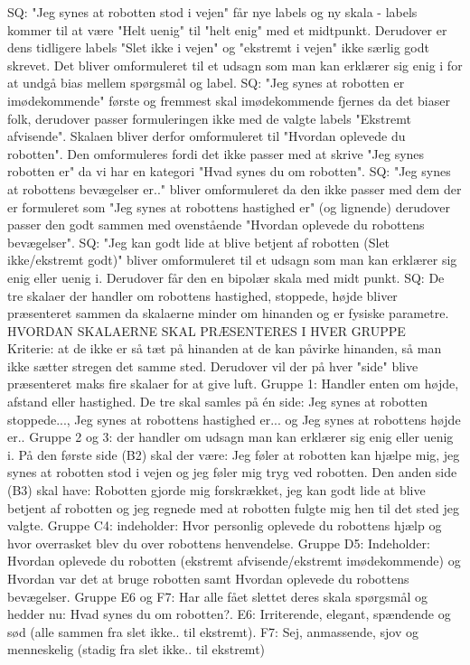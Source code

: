 %
SQ: "Jeg synes at robotten stod i vejen" får nye labels og ny skala - labels kommer til at være "Helt uenig" til "helt enig" med et midtpunkt. Derudover er dens tidligere labels "Slet ikke i vejen" og "ekstremt i vejen" ikke særlig godt skrevet. Det bliver omformuleret til et udsagn som man kan erklærer sig enig i for at undgå bias mellem spørgsmål og label.\blankline
%
SQ: "Jeg synes at robotten er imødekommende" første og fremmest skal imødekommende fjernes da det biaser folk, derudover passer formuleringen ikke med de valgte labels "Ekstremt afvisende". Skalaen bliver derfor omformuleret til "Hvordan oplevede du robotten". Den omformuleres fordi det ikke passer med at skrive "Jeg synes robotten er" da vi har en kategori "Hvad synes du om robotten". \blankline
%
SQ: "Jeg synes at robottens bevægelser er.." bliver omformuleret da den ikke passer med dem der er formuleret som "Jeg synes at robottens hastighed er" (og lignende) derudover passer den godt sammen med ovenstående "Hvordan oplevede du robottens bevægelser".\blankline
%
SQ: "Jeg kan godt lide at blive betjent af robotten (Slet ikke/ekstremt godt)" bliver omformuleret til et udsagn som man kan erklærer sig enig eller uenig i. Derudover får den en bipolær skala med midt punkt. \blankline
%
SQ: De tre skalaer der handler om robottens hastighed, stoppede, højde bliver præsenteret sammen da skalaerne minder om hinanden og er fysiske parametre. \blankline
%
HVORDAN SKALAERNE SKAL PRÆSENTERES I HVER GRUPPE\\
Kriterie: at de ikke er så tæt på hinanden at de kan påvirke hinanden, så man ikke sætter stregen det samme sted. Derudover vil der på hver "side" blive præsenteret maks fire skalaer for at give luft.\blankline 
%
Gruppe 1: Handler enten om højde, afstand eller hastighed. De tre skal samles på én side: Jeg synes at robotten stoppede..., Jeg synes at robottens hastighed er... og Jeg synes at robottens højde er..\blankline
%
Gruppe 2 og 3: der handler om udsagn man kan erklærer sig enig eller uenig i. På den første side (B2) skal der være: Jeg føler at robotten kan hjælpe mig, jeg synes at robotten stod i vejen og jeg føler mig tryg ved robotten. Den anden side (B3) skal have: Robotten gjorde mig forskrækket, jeg kan godt lide at blive betjent af robotten og jeg regnede med at robotten fulgte mig hen til det sted jeg valgte. \blankline
%
Gruppe C4: indeholder: Hvor personlig oplevede du robottens hjælp og hvor overrasket blev du over robottens henvendelse.\blankline 
%
Gruppe D5: Indeholder: Hvordan oplevede du robotten (ekstremt afvisende/ekstremt imødekommende) og Hvordan var det at bruge robotten samt Hvordan oplevede du robottens bevægelser. \blankline
%
Gruppe E6 og F7: Har alle fået slettet deres skala spørgsmål og hedder nu: Hvad synes du om robotten?. E6: Irriterende, elegant, spændende og sød (alle sammen fra slet ikke.. til ekstremt). F7: Sej, anmassende, sjov og menneskelig (stadig fra slet ikke.. til ekstremt)






   

  
